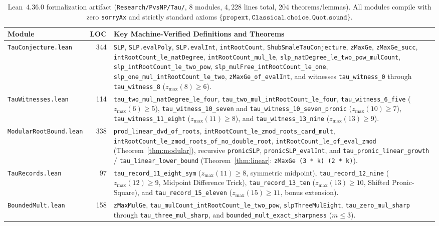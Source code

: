 \documentclass[11pt]{article}
\newcommand{\code}[1]{\texttt{#1}}
\newcommand{\zmax}{z_{\max}}
\begin{document}
\begin{table}[ht]
\centering
\small
\caption{Lean~4.36.0 formalization artifact (\code{Research/PvsNP/Tau/}, $8$ modules, $4{,}228$ lines total, $204$ theorems/lemmas). All modules compile with zero \code{sorryAx} and strictly standard axioms $\{\code{propext}, \code{Classical.choice}, \code{Quot.sound}\}$.}
\label{tab:lean}
\begin{tabularx}{\textwidth}{@{}l r X@{}}
\toprule
Module & LOC & Key Machine-Verified Definitions and Theorems \\
\midrule
\code{TauConjecture.lean} & 344 &
\code{SLP}, \code{SLP.evalPoly}, \code{SLP.evalInt}, \code{intRootCount}, \code{ShubSmaleTauConjecture}, \code{zMaxGe}, \code{zMaxGe\_succ}, \code{intRootCount\_le\_natDegree}, \code{intRootCount\_mul\_le}, \code{slp\_natDegree\_le\_two\_pow\_mulCount}, \code{slp\_intRootCount\_le\_two\_pow}, \code{slp\_mulFree\_intRootCount\_le\_one}, \code{slp\_one\_mul\_intRootCount\_le\_two}, \code{zMaxGe\_of\_evalInt}, and witnesses \code{tau\_witness\_0} through \code{tau\_witness\_8} ($\zmax(8) \ge 6$). \\
\addlinespace[3pt]
\code{TauWitnesses.lean} & 114 &
\code{tau\_two\_mul\_natDegree\_le\_four}, \code{tau\_two\_mul\_intRootCount\_le\_four}, \code{tau\_witness\_6\_five} ($\zmax(6) \ge 5$), \code{tau\_witness\_10\_seven} and \code{tau\_witness\_10\_seven\_pronic} ($\zmax(10) \ge 7$), \code{tau\_witness\_11\_eight} ($\zmax(11) \ge 8$), and \code{tau\_witness\_13\_nine} ($\zmax(13) \ge 9$). \\
\addlinespace[3pt]
\code{ModularRootBound.lean} & 338 &
\code{prod\_linear\_dvd\_of\_roots}, \code{intRootCount\_le\_zmod\_roots\_card\_mult}, \code{intRootCount\_le\_zmod\_roots\_of\_no\_double\_root}, \code{intRootCount\_le\_of\_eval\_zmod} (Theorem~\ref{thm:modular}), recursive \code{pronicSLP}, \code{pronicSLP\_evalInt}, and \code{tau\_pronic\_linear\_growth} / \code{tau\_linear\_lower\_bound} (Theorem~\ref{thm:linear}: \code{zMaxGe (3 * k) (2 * k)}). \\
\addlinespace[3pt]
\code{TauRecords.lean} & 97 &
\code{tau\_record\_11\_eight\_sym} ($\zmax(11) \ge 8$, symmetric midpoint), \code{tau\_record\_12\_nine} ($\zmax(12) \ge 9$, Midpoint Difference Trick), \code{tau\_record\_13\_ten} ($\zmax(13) \ge 10$, Shifted Pronic-Square), and \code{tau\_record\_15\_eleven} ($\zmax(15) \ge 11$, bonus extension). \\
\addlinespace[3pt]
\code{BoundedMult.lean} & 158 &
\code{zMaxMulGe}, \code{tau\_mulCount\_intRootCount\_le\_two\_pow}, \code{slpThreeMulEight}, \code{tau\_zero\_mul\_sharp} through \code{tau\_three\_mul\_sharp}, and \code{bounded\_mult\_exact\_sharpness} ($m \le 3$). \\

\end{tabularx}
\end{table}
\end{document}
